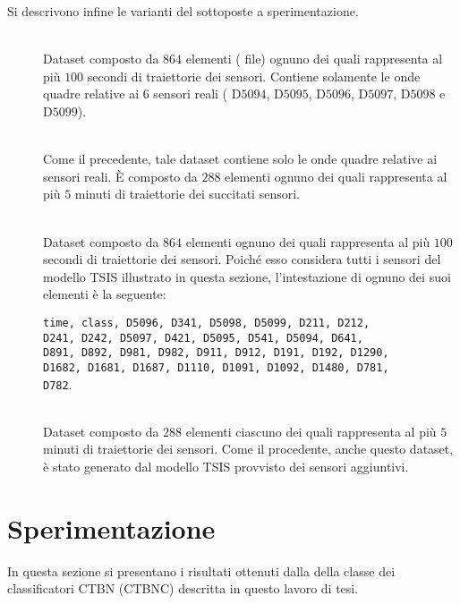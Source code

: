 Si descrivono infine le varianti del  sottoposte a sperimentazione.
\begin{description}
	\item[] \hfill \\
	Dataset composto da $864$ elementi (\ie{} file) ognuno dei quali rappresenta al più $100$ secondi di traiettorie dei sensori. Contiene solamente le onde quadre relative ai $6$ sensori reali (\ie{} D$5094$, D$5095$, D$5096$, D$5097$, D$5098$ e D$5099$).
	\item[] \hfill \\
	Come il precedente, tale dataset contiene solo le onde quadre relative ai sensori reali. \`E composto da $288$ elementi ognuno dei quali rappresenta al più $5$ minuti di traiettorie dei succitati sensori.
	\item[] \hfill \\
	Dataset composto da $864$ elementi ognuno dei quali rappresenta al più $100$ secondi di traiettorie dei sensori. Poiché esso considera tutti i sensori del modello \acs{TSIS} illustrato in questa sezione, l'intestazione di ognuno dei suoi elementi è la seguente:\par
	\lstinline[]|time, class, D5096, D341, D5098, D5099, D211, D212, |\\\lstinline[]|D241, D242, D5097, D421, D5095, D541, D5094, D641, |\\\lstinline[]|D891, D892, D981, D982, D911, D912, D191, D192, D1290, |\\\lstinline[]|D1682, D1681, D1687, D1110, D1091, D1092, D1480, D781, |\\\lstinline[]|D782|.
	\item[] \hfill \\
	Dataset composto da $288$ elementi ciascuno dei quali rappresenta al più $5$ minuti di traiettorie dei sensori. Come il procedente, anche questo dataset, è stato generato dal modello \acs{TSIS} provvisto dei sensori aggiuntivi.
\end{description}

\cleardoublepage
\section{Sperimentazione}
In questa sezione si presentano i risultati ottenuti dalla  della classe dei classificatori \acs{CTBN} (\acs{CTBNC}) descritta in questo lavoro di tesi.

